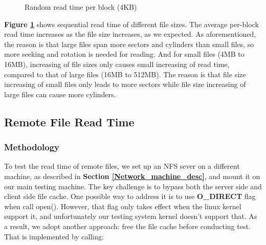 \begin{figure}[ht]
    \centering
    \caption{Random read time per block (4KB)}
    \label{rand_read_time}
\end{figure}

\textbf{Figure \ref{rand_read_time}} shows sequential read time of different file sizes. The average per-block read time increases as the file size increases, as we expected. As aforementioned, the reason is that large files span more sectors and cylinders than small files, so more seeking and rotation is needed for reading. And for small files (4MB to 16MB), increasing of file sizes only causes small increasing of read time, compared to that of large files (16MB to 512MB).
The reason is that file size increasing of small files only leads to more sectors while file size increasing of large files can cause more cylinders.

\subsection{Remote File Read Time}

\subsubsection{Methodology}
To test the read time of remote files, we set up an NFS sever on a different machine, as described in \textbf{Section \ref{Network_machine_desc}}, and mount it on our main testing machine. The key challenge is to bypass both the server side and client side file cache. One possible way to address it is to use \textbf{O\_DIRECT} flag when call open(). However, that flag only takes effect when the linux kernel support it, and unfortunately our testing system kernel doesn't support that. As a result,
we adopt another approach: free the file cache before conducting test. That is implemented by calling:

